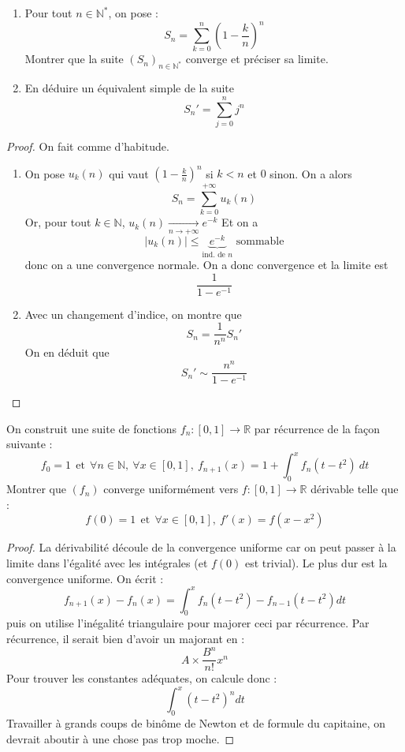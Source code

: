 \documentclass[french,a4paper]{article}
\newcommand{\N}{\mathbb{N}}
\newcommand{\R}{\mathbb{R}}
\newcommand{\st}{^*}
\theoremstyle{plain}
\theoremstyle{definition}
\theoremstyle{remark}
\begin{document}
\begin{ex}{}
	\begin{enumerate}
		\item Pour tout $n\in\N\st$, on pose : $$S_n=\sum_{k=0}^{n}\left(1-\frac{k}{n}\right)^n$$ Montrer que la suite $(S_n)_{n\in\N\st}$ converge et préciser sa limite.
		\item En déduire un équivalent simple de la suite $$S_n'=\sum_{j=0}^{n}j^n$$
	\end{enumerate}
\end{ex}
\begin{proof}
	On fait comme d'habitude.
	\begin{enumerate}
		\item On pose $u_k(n)$ qui vaut $\displaystyle\left(1-\frac{k}{n}\right)^n$ si $k<n$ et $0$ sinon. On a alors $$S_n=\sum_{k=0}^{+\infty}u_k(n)$$ Or, pour tout $k\in\N$, $u_k(n)\xrightarrow[n\to+\infty]{}e^{-k}$ Et on a $$\lvert u_k(n)\rvert\leqslant \underbrace{e^{-k}}_{\text{ind. de }n}\text{ sommable}$$ donc on a une convergence normale. On a donc convergence et la limite est $$\frac{1}{1-e^{-1}}$$
		\item Avec un changement d'indice, on montre que $$S_n=\frac{1}{n^n}S_n'$$ On en déduit que $$S_n'\sim\frac{n^n}{1-e^{-1}}$$
	\end{enumerate}
\end{proof}

\begin{ex}{}
	On construit une suite de fonctions $f_n:[0,1]\to\R$ par récurrence de la façon suivante : $$f_0=1\ \ \text{et}\ \ \forall n\in\N,\ \forall x\in[0,1],\ f_{n+1}(x)=1+\int_{0}^{x}f_n(t-t^2)\ dt$$ Montrer que $(f_n)$ converge uniformément vers $f:[0,1]\to\R$ dérivable telle que : $$f(0)=1 \ \ \text{et}\ \ \forall x\in[0,1],\ f'(x)=f(x-x^2)$$
\end{ex}
\begin{proof}
	La dérivabilité découle de la convergence uniforme car on peut passer à la limite dans l'égalité avec les intégrales (et $f(0)$ est trivial). Le plus dur est la convergence uniforme. On écrit : $$f_{n+1}(x)-f_n(x)=\int_{0}^{x}f_{n}(t-t^2)-f_{n-1}(t-t^2)dt$$ puis on utilise l'inégalité triangulaire pour majorer ceci par récurrence. Par récurrence, il serait bien d'avoir un majorant en : $$A\times\frac{B^n}{n!}x^n$$ Pour trouver les constantes adéquates, on calcule donc : $$\int_{0}^{x}(t-t^2)^ndt$$ Travailler à grands coups de binôme de Newton et de formule du capitaine, on devrait aboutir à une chose pas trop moche.
\end{proof}
\end{document}
